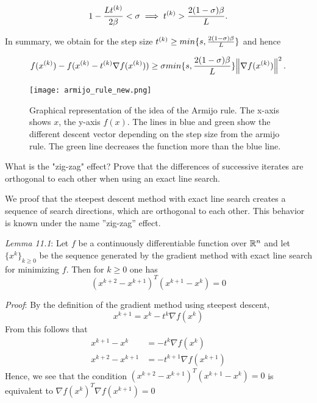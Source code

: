\documentclass[12pt,a4paper]{article}
\begin{document}
	\begin{equation*} 
     1 - \frac{Lt^{(k)}}{2\beta} < \sigma \implies t^{(k)} > \frac{2(1-\sigma)\beta}{L}.
	\end{equation*}
    
    In summary, we obtain for the step size $t^{(k)} \geq min\{s,\frac{2(1-\sigma)\beta}{L}\}$ and hence
    
    \begin{equation*}
      f(x^{(k)}) - f(x^{(k)} - t^{(k)}\nabla f(x^{(k)})) \geq \sigma min\{s,\frac{2(1- \sigma) \beta}{L}\}\norm{\nabla f(x^{(k)})}^2.
	\end{equation*}
	

    \begin{figure}[H]
      \centering
      \texttt{[image: armijo\_rule\_new.png]}
      \caption{Graphical representation of the idea of the Armijo rule.  The x-axis shows $x$,
        the y-axis $f(x)$. The lines in blue and green show the different descent vector depending on the step size from the armijo rule. The green line decreases the function more than the blue line.\label{fig:armijo}}
    \end{figure}


\begin{question}
What is the "zig-zag" effect? Prove that the differences of successive iterates are orthogonal to each other when using an exact line search.
\end{question}

We proof that the steepest descent method with exact line search creates a
sequence of search directions, which are orthogonal to each other. This behavior is known
under the name ''zig-zag'' effect.

\textit{Lemma 11.1}: Let $f$ be a continuously differentiable function over $\mathbb{R}^n$ and let $\{x^k\}_{k \ge0}$ be the sequence generated by the gradient method with exact line search for minimizing $f$. Then for $k \ge 0$ one has 
$$( x^{k+2} - x^{k+1})^T( x^{k+1} - x^{k}) = 0$$ 

\textit{Proof}: By the definition of the gradient method using steepest descent,
	$$x^{k+1} = x^{k}-t^{k}\nabla f(x^{k})$$
	From this follows that
    \begin{align*}
	 x^{k+1} - x^{k}&= -t^k \nabla f(x^{k})\\
	 x^{k+2} - x^{k+1} &= -t^{k+1} \nabla f(x^{k+1})
    \end{align*}
	Hence, we see that the condition $( x^{k+2} - x^{k+1})^T( x^{k+1} - x^{k}) = 0$ is equivalent to $\nabla f(x^{k})^T \nabla f(x^{k+1}) = 0$
	
\end{document}
